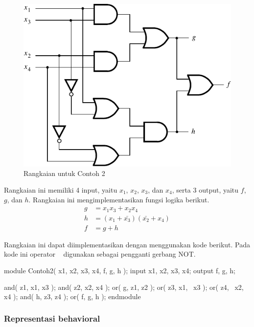 \documentclass[a4paper,11pt,bahasa]{extarticle}
\begin{document}
\begin{figure}[H]
\centering
\includegraphics[scale=1.0]{images/fig_2_39.pdf}
\par
\caption{Rangkaian untuk Contoh 2}\label{fig:Contoh2}
\end{figure}

Rangkaian ini memiliki 4 input, yaitu $x_1$, $x_2$, $x_3$, dan
$x_4$, serta 3 output, yaitu $f$, $g$, dan $h$.
Rangkaian ini mengimplementasikan fungsi logika berikut.
\begin{align*}
g & = x_1 x_3 + x_2 x_4 \\
h & = (x_1 + \bar{x_3})(\bar{x_2} + x_4) \\
f & = g + h
\end{align*}

Rangkaian ini dapat diimplementasikan dengan menggunakan kode berikut.
Pada kode ini operator {\tt \textbf{~}} digunakan sebagai pengganti gerbang
NOT.
{
\begin{verilogcode}
module Contoh2( x1, x2, x3, x4, f, g, h );
  input x1, x2, x3, x4;
  output f, g, h;

  and( z1, x1, x3 );
  and( z2, x2, x4 );
  or( g, z1, z2 );
  or( z3, x1, ~x3 );
  or( z4, ~x2, x4 );
  and( h, z3, z4 );
  or( f, g, h );
endmodule
\end{verilogcode}
}

\subsubsection{Representasi behavioral}
\end{document}
